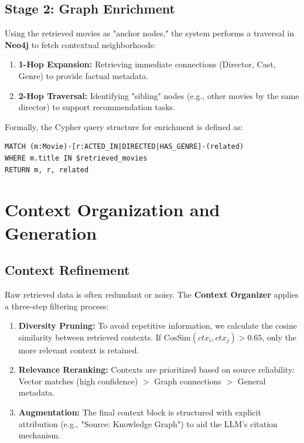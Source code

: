 \documentclass[a4paper, 12pt]{extreport}
\begin{document}
\subsection{Stage 2: Graph Enrichment}
Using the retrieved movies as "anchor nodes," the system performs a traversal in \textbf{Neo4j} to fetch contextual neighborhoods:
\begin{enumerate}
    \item \textbf{1-Hop Expansion:} Retrieving immediate connections (Director, Cast, Genre) to provide factual metadata.
    \item \textbf{2-Hop Traversal:} Identifying "sibling" nodes (e.g., other movies by the same director) to support recommendation tasks.
\end{enumerate}

Formally, the Cypher query structure for enrichment is defined as:
\begin{verbatim}
MATCH (m:Movie)-[r:ACTED_IN|DIRECTED|HAS_GENRE]-(related)
WHERE m.title IN $retrieved_movies
RETURN m, r, related
\end{verbatim}

\section{Context Organization and Generation}
\label{sec:context_generation}

\subsection{Context Refinement}
Raw retrieved data is often redundant or noisy. The \textbf{Context Organizer} applies a three-step filtering process:
\begin{enumerate}
    \item \textbf{Diversity Pruning:} To avoid repetitive information, we calculate the cosine similarity between retrieved contexts. If $\text{CosSim}(ctx_i, ctx_j) > 0.65$, only the more relevant context is retained.
    \item \textbf{Relevance Reranking:} Contexts are prioritized based on source reliability: Vector matches (high confidence) $>$ Graph connections $>$ General metadata.
    \item \textbf{Augmentation:} The final context block is structured with explicit attribution (e.g., "Source: Knowledge Graph") to aid the LLM's citation mechanism.
\end{enumerate}
\end{document}

